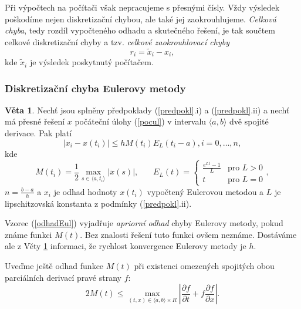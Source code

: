 \documentclass[a4paper, 12pt]{book}
\theoremstyle{definition}
\newtheorem{theorem}{Věta}[section]
\begin{document}
Při výpočtech na počítači však nepracujeme s přesnými čísly. Vždy výsledek poškodíme
nejen diskretizační chybou, ale také jej zaokrouhlujeme. {\em Celková chyba}, tedy
rozdíl vypočteného odhadu a skutečného řešení, je tak součtem celkové diskretizační 
chyby a tzv. {\em celkové zaokrouhlovací chyby}
\begin{equation}\label{zaokrch}
r_i=\tilde x_i-x_i,
\end{equation}
kde $\tilde x_i$ je výsledek poskytnutý počítačem.

\subsubsection{Diskretizační chyba Eulerovy metody}
\begin{theorem}\label{Veta2.2}
Nechť jsou splněny předpoklady (\ref{predpokl}.i) a (\ref{predpokl}.ii) a nechť
má přesné řešení $x$ počáteční úlohy (\ref{pocul}) v intervalu $\langle a,b\rangle$ 
dvě spojité derivace. Pak platí
\begin{equation}\label{odhadEul}
|x_i-x(t_i)| \leq h M(t_i) E_L(t_i-a), i=0,\dots,n,
\end{equation}
kde 
\begin{displaymath}
M(t_i) = \frac 12 \max_{s\in\langle a,t_i\rangle} |\ddot x(s)|, ~~~~~~~~
E_L(t)=\left\{\begin{array}{ll}\frac{e^{Lt}-1}{L}&\mbox{pro } L>0\\ t&\mbox{pro } L=0
\end{array}\right. ,
\end{displaymath}
$n=\frac {b-a}h$ a $x_i$ je odhad hodnoty $x(t_i)$ vypočtený Eulerovou metodou a $L$ je 
lipschitzovská konstanta z podmínky (\ref{predpokl}.ii).
\end{theorem}
Vzorec (\ref{odhadEul}) vyjadřuje {\em apriorní odhad} chyby Eulerovy metody, 
pokud známe funkci $M(t)$. Bez znalosti řešení tuto funkci ovšem neznáme. 
Dostáváme ale z Věty \ref{Veta2.2} informaci, že rychlost konvergence Eulerovy 
metody je $h$.

Uveďme ještě odhad funkce $M(t)$ při existenci omezených spojitých obou 
parciálních derivací pravé strany $f$:
\begin{displaymath}
2M(t)\leq \max_{(t,x)\in \langle a,b\rangle\times R}\left|\frac{\partial f}{\partial t}+ 
f\frac{\partial f}{\partial x}\right|.
\end{displaymath}
\end{document}
